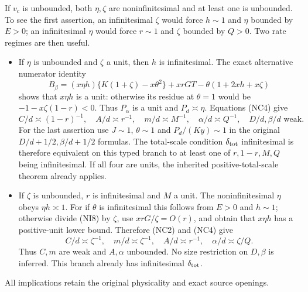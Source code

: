 If $v_c$ is unbounded, both $\eta,\zeta$ are noninfinitesimal and
at least one is unbounded. To see the first assertion, an infinitesimal
$\zeta$ would force $h\sim1$ and $\eta$ bounded by $E>0$;
an infinitesimal $\eta$ would force $r\sim1$ and $\zeta$ bounded
by $Q>0$. Two rate regimes are then useful.
\begin{itemize}
\item If $\eta$ is unbounded and $\zeta$ a unit, then $h$ is
infinitesimal. The exact alternative numerator identity
\[
 B_\beta=(x\eta h)\{K(1+\zeta)-x\theta^2\}
             +xrGT-\theta(1+2xh+x\zeta)             \tag{NI8}
\]
shows that $x\eta h$ is a unit: otherwise its residue at
$\theta=1$ would be $-1-x\zeta(1-r)<0$.
Thus $P_\alpha$ is a unit and $P_d\asymp\eta$.
Equations (NC4) give
\[
 C/d\asymp(1-r)^{-1},\quad A/d\asymp r^{-1},\quad
 m/d\asymp M^{-1},\quad\alpha/d\asymp Q^{-1},
 \quad D/d,\beta/d\text{ weak}.                    \tag{NI9}
\]
For the last assertion use $J\sim1$, $\theta\sim1$ and
$P_d/(Ky)\sim1$ in the original $D/d+1/2,\beta/d+1/2$
formulas. The total-scale condition $\delta_{\rm tot}$ infinitesimal
is therefore equivalent on this typed branch to at least one of
$r,1-r,M,Q$ being infinitesimal. If all four are units, the inherited
positive-total-scale theorem already applies.

\item If $\zeta$ is unbounded, $r$ is infinitesimal and $M$ a
unit. The noninfinitesimal $\eta$ obeys $\eta h\asymp1$.
For if $\theta$ is infinitesimal this follows from $E>0$ and
$h\sim1$; otherwise divide (NI8) by $\zeta$, use
$xrG/\zeta=O(r)$, and obtain that $x\eta h$ has a positive-unit
lower bound. Therefore (NC2) and (NC4) give
\[
 C/d\asymp\zeta^{-1},\quad m/d\asymp\zeta^{-1},\quad
 A/d\asymp r^{-1},\quad\alpha/d\asymp\zeta/Q.
 \tag{NI10}
\]
Thus $C,m$ are weak and $A,\alpha$ unbounded. No size restriction
on $D,\beta$ is inferred. This branch already has infinitesimal
$\delta_{\rm tot}$.
\end{itemize}
All implications retain the original physicality and exact source openings.


